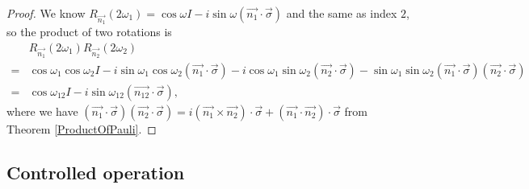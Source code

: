 \documentclass[a4paper,10pt]{book}
\numberwithin{equation}{section}
\begin{document}
\begin{proof}
    We know $R_{\vec{n_{1}}}(2\omega_{1})=\cos\omega I-i\sin\omega(\vec{n_{1}}\cdot\vec{\sigma})$ and the same as index $2$, so the product of two rotations is
    \begin{equation*}
        \begin{split}
              & R_{\vec{n_{1}}}(2\omega_{1})R_{\vec{n_{2}}}(2\omega_{2})                                                                                                                                                                                       \\
            = & \cos\omega_{1}\cos\omega_{2}I-i\sin\omega_{1}\cos\omega_{2}(\vec{n_{1}}\cdot\vec{\sigma})-i\cos\omega_{1}\sin\omega_{2}(\vec{n_{2}}\cdot\vec{\sigma})-\sin\omega_{1}\sin\omega_{2}(\vec{n_{1}}\cdot\vec{\sigma})(\vec{n_{2}}\cdot\vec{\sigma}) \\
            = & \cos\omega_{12}I-i\sin\omega_{12}(\vec{n_{12}}\cdot\vec{\sigma}),
        \end{split}
    \end{equation*}
    where we have $(\vec{n_{1}}\cdot\vec{\sigma})(\vec{n_{2}}\cdot\vec{\sigma})=i(\vec{n_{1}}\times\vec{n_{2}})\cdot\vec{\sigma}+(\vec{n_{1}}\cdot\vec{n_{2}})\cdot\vec{\sigma}$ from Theorem \ref{ProductOfPauli}.
\end{proof}



\subsection{\label{CtrlGate}Controlled operation}
\end{document}
